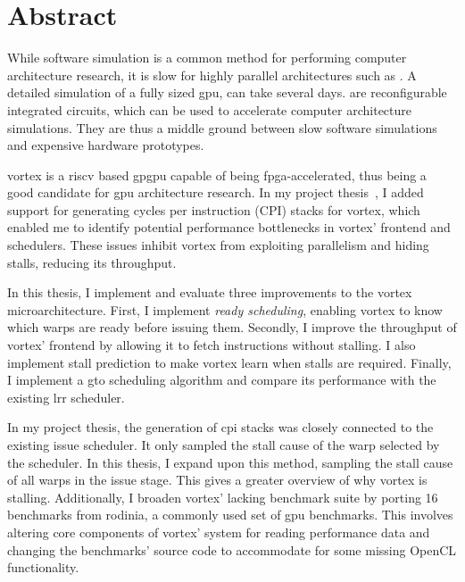 \chapter*{Abstract}

While software simulation is a common method for performing computer architecture research, it is slow for highly parallel architectures such as . A detailed simulation of a fully sized \acrshort{gpu}, can take several days.  are reconfigurable integrated circuits, which can be used to accelerate computer architecture simulations. They are thus a middle ground between slow software simulations and expensive hardware prototypes.

\Gls{vortex} is a \Gls{riscv} based \acrshort{gpgpu} capable of being \acrshort{fpga}-accelerated, thus being a good candidate for \acrshort{gpu} architecture research. In my project thesis~\cite{Aurud_Project}, I added support for generating cycles per instruction (CPI) stacks for \Gls{vortex}, which enabled me to identify potential performance bottlenecks in \Gls{vortex}' frontend and schedulers. These issues inhibit \Gls{vortex} from exploiting parallelism and hiding stalls, reducing its throughput.

In this thesis, I implement and evaluate three improvements to the \Gls{vortex} microarchitecture. First, I implement \textit{ready scheduling}, enabling \Gls{vortex} to know which warps are ready before issuing them. Secondly, I improve the throughput of \Gls{vortex}' frontend by allowing it to fetch instructions without stalling. I also implement stall prediction to make \Gls{vortex} learn when stalls are required. Finally, I implement a \acrfull{gto} scheduling algorithm and compare its performance with the existing \acrfull{lrr} scheduler.

In my project thesis, the generation of \acrshort{cpi} stacks was closely connected to the existing issue scheduler. It only sampled the stall cause of the warp selected by the scheduler. In this thesis, I expand upon this method, sampling the stall cause of all warps in the issue stage. This gives a greater overview of why \Gls{vortex} is stalling. Additionally, I broaden \Gls{vortex}' lacking benchmark suite by porting 16 benchmarks from \Gls{rodinia}, a commonly used set of \acrshort{gpu} benchmarks. This involves altering core components of \Gls{vortex}' system for reading performance data and changing the benchmarks' source code to accommodate for some missing OpenCL functionality. 

